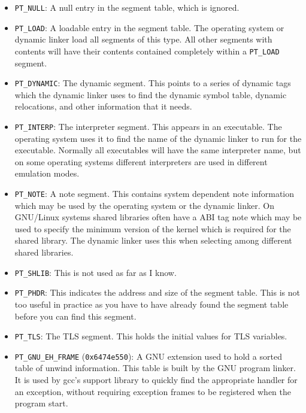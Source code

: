 \begin{itemize}
    \item \texttt{PT\_NULL}: A null entry in the segment table, which is ignored.

    \item \texttt{PT\_LOAD}: A loadable entry in the segment table.  The operating
          system or dynamic linker load all segments of this type.  All other
          segments with contents will have their contents contained completely
          within a \texttt{PT\_LOAD} segment.

    \item \texttt{PT\_DYNAMIC}: The dynamic segment.  This points to a series of
          dynamic tags which the dynamic linker uses to find the dynamic symbol
          table, dynamic relocations, and other information that it needs.

    \item \texttt{PT\_INTERP}: The interpreter segment.  This appears in an
          executable.  The operating system uses it to find the name of the
          dynamic linker to run for the executable.  Normally all executables
          will have the same interpreter name, but on some operating systems
          different interpreters are used in different emulation modes.

    \item \texttt{PT\_NOTE}: A note segment.  This contains system dependent
          note information which may be used by the operating system or the
          dynamic linker.  On GNU/Linux systems shared libraries often have a
          ABI tag note which may be used to specify the minimum version of the
          kernel which is required for the shared library.  The dynamic linker
          uses this when selecting among different shared libraries.

    \item \texttt{PT\_SHLIB}: This is not used as far as I know.

    \item \texttt{PT\_PHDR}: This indicates the address and size of the segment
          table.  This is not too useful in practice as you have to have
          already found the segment table before you can find this segment.

    \item \texttt{PT\_TLS}: The TLS segment.  This holds the initial values for
          TLS variables.

    \item \texttt{PT\_GNU\_EH\_FRAME} (\texttt{0x6474e550}): A GNU extension used to
          hold a sorted table of unwind information.  This table is built by
          the GNU program linker.  It is used by gcc's support library to
          quickly find the appropriate handler for an exception, without
          requiring exception frames to be registered when the program start.  


\end{itemize}
